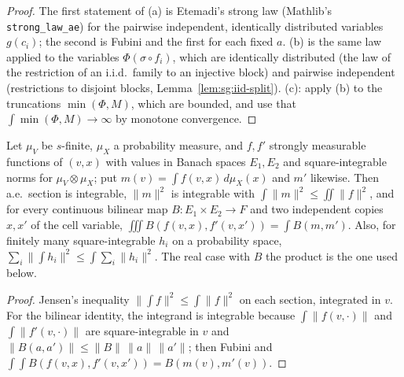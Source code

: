 \begin{proof}
  \leanok
The first statement of (a) is Etemadi's strong law (Mathlib's \texttt{strong\_law\_ae}) for the pairwise independent, identically distributed variables $g(c_i)$; the second is Fubini and the first for each fixed $a$. (b) is the same law applied to the variables $\Phi(\sigma\circ f_i)$, which are identically distributed (the law of the restriction of an i.i.d.\ family to an injective block) and pairwise independent (restrictions to disjoint blocks, Lemma~\ref{lem:sg:iid-split}). (c): apply (b) to the truncations $\min(\Phi,M)$, which are bounded, and use that $\int\min(\Phi,M)\to\infty$ by monotone convergence.
\end{proof}

\begin{lemma}\label{lem:sg:jensen-partial}
  \leanok
Let $\mu_V$ be $s$-finite, $\mu_X$ a probability measure, and $f,f'$ strongly measurable functions of $(v,x)$ with
values in Banach spaces $E_1,E_2$ and square-integrable norms for $\mu_V\otimes\mu_X$; put
$m(v)=\int f(v,x)\,d\mu_X(x)$ and $m'$ likewise. Then a.e.\ section is integrable, $\|m\|^2$ is integrable with
$\int\|m\|^2\le\iint\|f\|^2$, and for every continuous bilinear map $B:E_1\times E_2\to F$ and two independent copies
$x,x'$ of the cell variable, $\iiint B(f(v,x),f'(v,x'))=\int B(m,m')$. Also, for finitely many square-integrable
$h_i$ on a probability space, $\sum_i\|\int h_i\|^2\le\int\sum_i\|h_i\|^2$. The real case with $B$ the product is the
one used below.
\end{lemma}

\begin{proof}
  \leanok
Jensen's inequality $\|\int f\|^2\le\int\|f\|^2$ on each section, integrated in $v$. For the bilinear identity, the integrand is integrable because $\int\|f(v,\cdot)\|$ and $\int\|f'(v,\cdot)\|$ are square-integrable in $v$ and $\|B(a,a')\|\le\|B\|\,\|a\|\,\|a'\|$; then Fubini and $\int\!\int B(f(v,x),f'(v,x'))=B(m(v),m'(v))$.
\end{proof}


